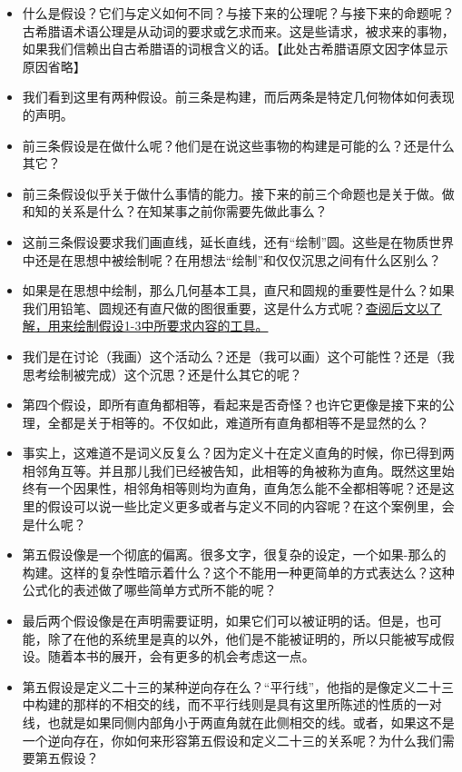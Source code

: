 \documentclass[
]{book}
\begin{document}
\begin{itemize}
\item
  什么是假设？它们与定义如何不同？与接下来的公理呢？与接下来的命题呢？古希腊语术语公理是从动词的要求或乞求而来。这是些请求，被求来的事物，如果我们信赖出自古希腊语的词根含义的话。【此处古希腊语原文因字体显示原因省略】
\item
  我们看到这里有两种假设。前三条是构建，而后两条是特定几何物体如何表现的声明。
\item
  前三条假设是在做什么呢？他们是在说这些事物的构建是可能的么？还是什么其它？
\item
  前三条假设似乎关于做什么事情的能力。接下来的前三个命题也是关于做。做和知的关系是什么？在知某事之前你需要先做此事么？
\item
  这前三条假设要求我们画直线，延长直线，还有``绘制''圆。这些是在物质世界中还是在思想中被绘制呢？在用想法``绘制''和仅仅沉思之间有什么区别么？
\item
  如果是在思想中绘制，那么几何基本工具，直尺和圆规的重要性是什么？如果我们用铅笔、圆规还有直尺做的图很重要，这是什么方式呢？\protect\hyperlink{instruments}{查阅后文以了解，用来绘制假设1-3中所要求内容的工具。}
\item
  我们是在讨论（我画）这个活动么？还是（我可以画）这个可能性？还是（我思考绘制被完成）这个沉思？还是什么其它的呢？
\item
  第四个假设，即所有直角都相等，看起来是否奇怪？也许它更像是接下来的公理，全都是关于相等的。不仅如此，难道所有直角都相等不是显然的么？
\item
  事实上，这难道不是词义反复么？因为定义十在定义直角的时候，你已得到两相邻角互等。并且那儿我们已经被告知，此相等的角被称为直角。既然这里始终有一个因果性，相邻角相等则均为直角，直角怎么能不全都相等呢？还是这里的假设可以说一些比定义更多或者与定义不同的内容呢？在这个案例里，会是什么呢？
\item
  第五假设像是一个彻底的偏离。很多文字，很复杂的设定，一个如果-那么的构建。这样的复杂性暗示着什么？这个不能用一种更简单的方式表达么？这种公式化的表述做了哪些简单方式所不能的呢？
\item
  最后两个假设像是在声明需要证明，如果它们可以被证明的话。但是，也可能，除了在他的系统里是真的以外，他们是不能被证明的，所以只能被写成假设。随着本书的展开，会有更多的机会考虑这一点。
\item
  第五假设是定义二十三的某种逆向存在么？``平行线''，他指的是像定义二十三中构建的那样的不相交的线，而不平行线则是具有这里所陈述的性质的一对线，也就是如果同侧内部角小于两直角就在此侧相交的线。或者，如果这不是一个逆向存在，你如何来形容第五假设和定义二十三的关系呢？为什么我们需要第五假设？
\end{itemize}
\end{document}
